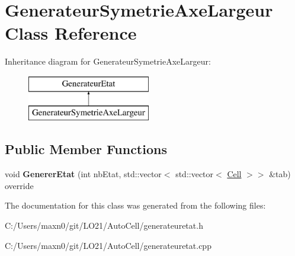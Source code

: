 \hypertarget{class_generateur_symetrie_axe_largeur}{}\section{Generateur\+Symetrie\+Axe\+Largeur Class Reference}
\label{class_generateur_symetrie_axe_largeur}
Inheritance diagram for Generateur\+Symetrie\+Axe\+Largeur\+:\begin{figure}[H]
\begin{center}
\leavevmode
\includegraphics[height=2.000000cm]{class_generateur_symetrie_axe_largeur}
\end{center}
\end{figure}
\subsection*{Public Member Functions}
\begin{DoxyCompactItemize}
\item 
\mbox{\label{class_generateur_symetrie_axe_largeur_ac11eee88b8728be13026ca408316561c}} 
void {\bfseries Generer\+Etat} (int nb\+Etat, std\+::vector$<$ std\+::vector$<$ \mbox{\hyperlink{class_cell}{Cell}} $>$$>$ \&tab) override
\end{DoxyCompactItemize}


The documentation for this class was generated from the following files\+:\begin{DoxyCompactItemize}
\item 
C\+:/\+Users/maxn0/git/\+L\+O21/\+Auto\+Cell/generateuretat.\+h\item 
C\+:/\+Users/maxn0/git/\+L\+O21/\+Auto\+Cell/generateuretat.\+cpp\end{DoxyCompactItemize}
